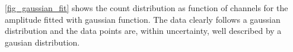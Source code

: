 %

\cref{fig_gaussian_fit}  shows the count distribution as function of channels for the amplitude fitted with gaussian function. The data clearly follows a gaussian distribution and the data points are, within uncertainty, well described by a gausian distribution. 

%
%
%
%
%

%

